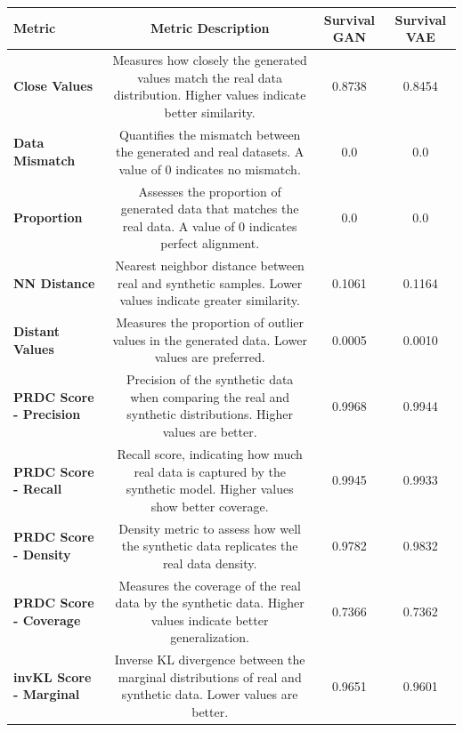\clearpage
\begin{landscape}
\begin{table}[H]
    \centering
    \begin{tabular}{|l|>{\tiny}c|c|c|}
    \hline
    \textbf{Metric}                & \textbf{Metric Description} & \textbf{Survival GAN} & \textbf{Survival VAE} \\ \hline
    \textbf{Close Values}          & Measures how closely the generated values match the real data distribution. Higher values indicate better similarity. & 0.8738           & 0.8454           \\ \hline
    \textbf{Data Mismatch}         & Quantifies the mismatch between the generated and real datasets. A value of 0 indicates no mismatch. & 0.0              & 0.0              \\ \hline
    \textbf{Proportion}            & Assesses the proportion of generated data that matches the real data. A value of 0 indicates perfect alignment. & 0.0              & 0.0              \\ \hline
    \textbf{NN Distance}           & Nearest neighbor distance between real and synthetic samples. Lower values indicate greater similarity. & 0.1061           & 0.1164           \\ \hline
    \textbf{Distant Values}        & Measures the proportion of outlier values in the generated data. Lower values are preferred. & 0.0005           & 0.0010           \\ \hline
    \textbf{PRDC Score - Precision}& Precision of the synthetic data when comparing the real and synthetic distributions. Higher values are better. & 0.9968           & 0.9944           \\ \hline
    \textbf{PRDC Score - Recall}   & Recall score, indicating how much real data is captured by the synthetic model. Higher values show better coverage. & 0.9945           & 0.9933           \\ \hline
    \textbf{PRDC Score - Density}  & Density metric to assess how well the synthetic data replicates the real data density. & 0.9782           & 0.9832           \\ \hline
    \textbf{PRDC Score - Coverage} & Measures the coverage of the real data by the synthetic data. Higher values indicate better generalization. & 0.7366           & 0.7362           \\ \hline
    \textbf{invKL Score - Marginal}& Inverse KL divergence between the marginal distributions of real and synthetic data. Lower values are better. & 0.9651           & 0.9601           \\ \hline

\end{tabular}
\end{table}
\end{landscape}
